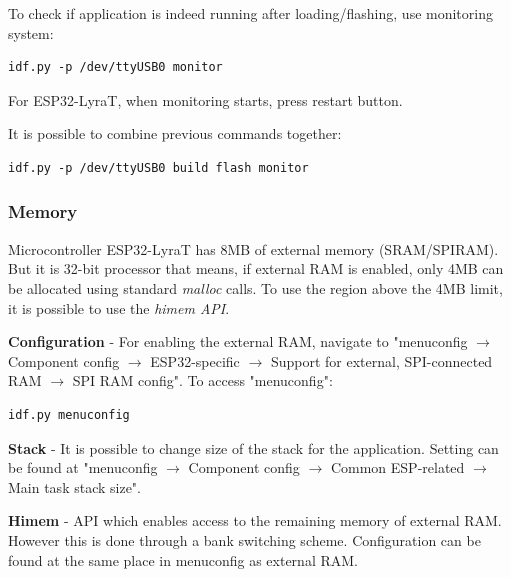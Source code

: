 \documentclass[thesis=M,english]{FITthesis}[2019/12/23]
\begin{document}
\bigskip
\noindent
To check if application is indeed running after loading/flashing, use monitoring system:
\begin{lstlisting}[frame=single]
idf.py -p /dev/ttyUSB0 monitor
\end{lstlisting}
For ESP32-LyraT, when monitoring starts, press restart button.

\bigskip
\noindent
It is possible to combine previous commands together:
\begin{lstlisting}[frame=single]
idf.py -p /dev/ttyUSB0 build flash monitor
\end{lstlisting}

\subsubsection{Memory} \label{esp-memory}
Microcontroller ESP32-LyraT has 8MB of external memory (SRAM/SPIRAM). But it is 32-bit processor that means, if external RAM is enabled, only 4MB can be allocated using standard \textit{malloc} calls. To use the region above the 4MB limit, it is possible to use the \textit{himem API}.

\bigskip
\noindent
\textbf{Configuration} - For enabling the external RAM, navigate to "menuconfig $\rightarrow$ Component config $\rightarrow$ ESP32-specific $\rightarrow$ Support for external, SPI-connected RAM $\rightarrow$ SPI RAM config". To access "menuconfig":
\begin{lstlisting}[frame=single]
idf.py menuconfig
\end{lstlisting}

\bigskip
\noindent
\textbf{Stack} - It is possible to change size of the stack for the application. Setting can be found at "menuconfig $\rightarrow$ Component config $\rightarrow$ Common ESP-related $\rightarrow$ Main task stack size".

\bigskip
\noindent
\textbf{Himem} - API which enables access to the remaining memory of external RAM. However this is done through a bank switching scheme. Configuration can be found at the same place in menuconfig as external RAM.

\end{document}
